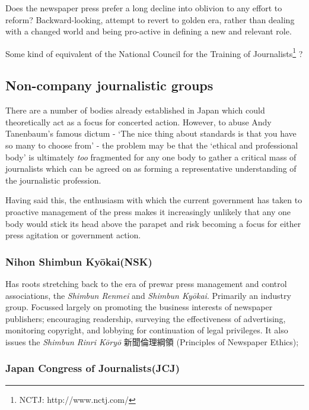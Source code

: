 \documentclass[11pt, headings=normal]{scrartcl}
\begin{document}
Does the newspaper press prefer a long decline into oblivion to any
effort to reform? Backward-looking, attempt to revert to golden era,
rather than dealing with a changed world and being pro-active in
defining a new and relevant role.

Some kind of equivalent of the National Council for the Training of
Journalists\footnote{NCTJ: http://www.nctj.com/} ?

\hypertarget{non-company-journalistic-groups}{%
\subsection{Non-company journalistic
groups}\label{non-company-journalistic-groups}}

There are a number of bodies already established in Japan which could
theoretically act as a focus for concerted action. However, to abuse
Andy Tanenbaum's famous dictum - `The nice thing about standards is that
you have so many to choose from' - the problem may be that the `ethical
and professional body' is ultimately \emph{too} fragmented for any one
body to gather a critical mass of journalists which can be agreed on as
forming a representative understanding of the journalistic profession.

Having said this, the enthusiasm with which the current government has
taken to proactive management of the press makes it increasingly
unlikely that any one body would stick its head above the parapet and
risk becoming a focus for either press agitation or government action.

\hypertarget{nihon-shimbun-kyux14dkainsk}{%
\subsubsection*{Nihon Shimbun
Kyōkai(NSK)}\label{nihon-shimbun-kyux14dkainsk}}

Has roots stretching back to the era of prewar press management and
control associations, the \emph{Shimbun Renmei} and \emph{Shimbun
Kyōkai}. Primarily an industry group. Focussed largely on promoting the
business interests of newspaper publishers; encouraging readership,
surveying the effectiveness of advertising, monitoring copyright, and
lobbying for continuation of legal privileges. It also issues the
\emph{Shimbun Rinri Kōryō} 新聞倫理綱領 (Principles of Newspaper
Ethics);

\hypertarget{japan-congress-of-journalistsjcj}{%
\subsubsection*{Japan Congress of
Journalists(JCJ)}\label{japan-congress-of-journalistsjcj}}
\end{document}
